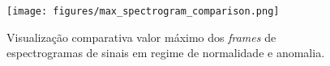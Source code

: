 \begin{figure}[H]
    \centering
    \texttt{[image: figures/max\_spectrogram\_comparison.png]}
    \caption{Visualização comparativa valor máximo dos \emph{frames} de
    espectrogramas de sinais em regime de normalidade e anomalia.}
    \label{fig:spectrograms_max}
\end{figure}

